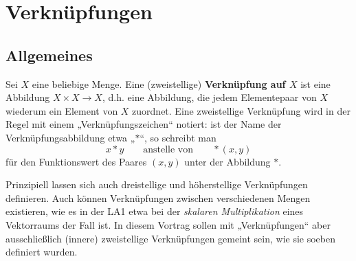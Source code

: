 



\chapter{Verknüpfungen} \label{chap:verknuepfungen}


\section{Allgemeines}


\begin{defin}[Verknüpfung] \label{def:verknuepfung} 
    Sei $X$ eine beliebige Menge. Eine (zweistellige) \textbf{Verknüpfung auf $X$} ist eine Abbildung $X\times X \to X$, d.h. eine Abbildung, die jedem Elementepaar von $X$ wiederum ein Element von $X$ zuordnet. Eine zweistellige Verknüpfung wird in der Regel mit einem „Verknüpfungszeichen“ notiert: ist der Name der Verknüpfungsabbildung etwa „$*$“, so schreibt man
        \[ x*y \qquad\text{anstelle von}\qquad *(x,y) \]
    für den Funktionswert des Paares $(x,y)$ unter der Abbildung $*$.
\end{defin}


\begin{bem}[* Verallgemeinerungen]
    Prinzipiell lassen sich auch dreistellige und höherstellige Verknüpfungen definieren. Auch können Verknüpfungen zwischen verschiedenen Mengen existieren, wie es in der LA1 etwa bei der \emph{skalaren Multiplikation} eines Vektorraums der Fall ist. In diesem Vortrag sollen mit „Verknüpfungen“ aber ausschließlich (innere) zweistellige Verknüpfungen gemeint sein, wie sie soeben definiert wurden.
\end{bem}


